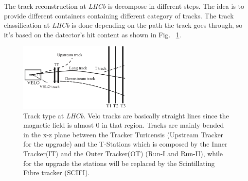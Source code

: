 \documentclass[paper=a4, fontsize=10pt]{scrartcl}
\numberwithin{equation}{section}		%
\numberwithin{figure}{section}			%
\numberwithin{table}{section}				%
\begin{document}
\begin{itemize}
\end{itemize}

The track reconstruction at \textit{LHCb} is decompose in different steps. The idea is to provide different containers containing different category of tracks. The track classification at \textit{LHCb} is done depending on the path the track goes through, so it's based on the datector's hit content as shown in Fig. ~\ref{figure:Tracks}.
\begin{figure}[h]
  \begin{center}
    \includegraphics[width=0.5\textwidth]{Images/tracktype.png} 
  \caption[Caption for track type]{Track type at \textit{LHCb}. Velo tracks are basically straight lines since the magnetic field is almost 0 in that region. Tracks are mainly bended in the x-z \footnotemark plane between the Tracker Turicensis (Upstream Tracker for the upgrade) and the T-Stations which is composed by the Inner Tracker(IT) and the Outer Tracker(OT) (Run-I and Run-II), while for the upgrade the stations will be replaced by the Scintillating Fibre tracker (SCIFI).}
  \label{figure:Tracks}
  \end{center}
\end{figure}
\end{document}

